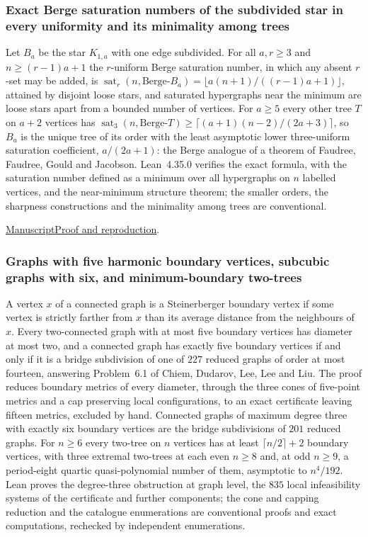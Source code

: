 \documentclass[11pt,a4paper]{article}
\begin{document}
\subsubsection{Exact Berge saturation numbers of the subdivided star in every uniformity and its minimality among trees}

Let $B_a$ be the star $K_{1,a}$ with one edge subdivided. For all $a,r\ge3$ and $n\ge(r-1)a+1$ the $r$-uniform Berge saturation number, in which any absent $r$-set may be added, is $\operatorname{sat}_r(n,\text{Berge-}B_a)=\lfloor a(n+1)/((r-1)a+1)\rfloor$, attained by disjoint loose stars, and saturated hypergraphs near the minimum are loose stars apart from a bounded number of vertices. For $a\ge5$ every other tree $T$ on $a+2$ vertices has $\operatorname{sat}_3(n,\text{Berge-}T)\ge\lceil(a+1)(n-2)/(2a+3)\rceil$, so $B_a$ is the unique tree of its order with the least asymptotic lower three-uniform saturation coefficient, $a/(2a+1)$: the Berge analogue of a theorem of Faudree, Faudree, Gould and Jacobson. Lean~4.35.0 verifies the exact formula, with the saturation number defined as a minimum over all hypergraphs on $n$ labelled vertices, and the near-minimum structure theorem; the smaller orders, the sharpness constructions and the minimality among trees are conventional.

\noindent\href{https://github.com/dvgyl/math-and-theory/blob/main/papers/mathematics/berge-subdivided-star/manuscript.pdf}{Manuscript}\quad\href{https://github.com/dvgyl/math-and-theory/blob/main/papers/mathematics/berge-subdivided-star/README.md}{Proof and reproduction}.

\subsubsection{Graphs with five harmonic boundary vertices, subcubic graphs with six, and minimum-boundary two-trees}

A vertex $x$ of a connected graph is a Steinerberger boundary vertex if some vertex is strictly farther from $x$ than its average distance from the neighbours of $x$. Every two-connected graph with at most five boundary vertices has diameter at most two, and a connected graph has exactly five boundary vertices if and only if it is a bridge subdivision of one of $227$ reduced graphs of order at most fourteen, answering Problem~6.1 of Chiem, Dudarov, Lee, Lee and Liu. The proof reduces boundary metrics of every diameter, through the three cones of five-point metrics and a cap preserving local configurations, to an exact certificate leaving fifteen metrics, excluded by hand. Connected graphs of maximum degree three with exactly six boundary vertices are the bridge subdivisions of $201$ reduced graphs. For $n\ge6$ every two-tree on $n$ vertices has at least $\lceil n/2\rceil+2$ boundary vertices, with three extremal two-trees at each even $n\ge8$ and, at odd $n\ge9$, a period-eight quartic quasi-polynomial number of them, asymptotic to $n^4/192$. Lean proves the degree-three obstruction at graph level, the $835$ local infeasibility systems of the certificate and further components; the cone and capping reduction and the catalogue enumerations are conventional proofs and exact computations, rechecked by independent enumerations.
\end{document}
